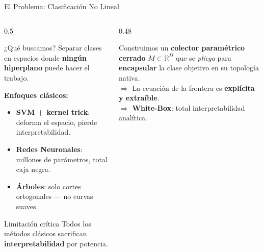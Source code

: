\documentclass[aspectratio=169,10pt]{beamer}
\newcommand{\highlight}[1]{\textcolor{accent}{\textbf{#1}}}
\begin{document}
\begin{frame}{El Problema: Clasificación No Lineal}
  \begin{columns}[T]
    \begin{column}{0.5\textwidth}
      \begin{block}{¿Qué buscamos?}
        Separar clases en espacios donde \textbf{ningún hiperplano} puede hacer el trabajo.
      \end{block}
      \vspace{6pt}
      \textbf{Enfoques clásicos:}
      \begin{itemize}
        \item \textbf{SVM + kernel trick}: deforma el espacio, pierde interpretabilidad.
        \item \textbf{Redes Neuronales}: millones de parámetros, total caja negra.
        \item \textbf{Árboles}: solo cortes ortogonales — no curvas suaves.
      \end{itemize}
      \vspace{6pt}
      \begin{alertblock}{Limitación crítica}
        Todos los métodos clásicos sacrifican \textbf{interpretabilidad} por potencia.
      \end{alertblock}
    \end{column}
    \begin{column}{0.48\textwidth}
      \begin{tcolorbox}[mydef={Nuestra propuesta}]
        Construimos un \textbf{colector paramétrico cerrado} $M \subset \mathbb{R}^D$ que se \emph{pliega} para \textbf{encapsular} la clase objetivo en su topología nativa.\\[6pt]
        $\Rightarrow$ La ecuación de la frontera es \textbf{explícita y extraíble}.\\[4pt]
        $\Rightarrow$ \highlight{White-Box}: total interpretabilidad analítica.
      \end{tcolorbox}
    \end{column}
  \end{columns}
\end{frame}
\end{document}
